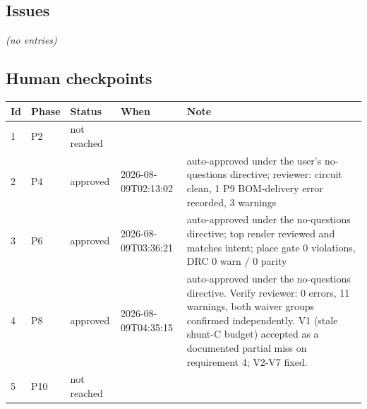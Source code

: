 \documentclass[11pt,a4paper]{article}
\begin{document}
\subsection*{Issues}
\emph{(no entries)}
\subsection*{Human checkpoints}
{\small
\begin{longtable}{lllp{2.6cm}p{6.4cm}}
\toprule
\textbf{Id} & \textbf{Phase} & \textbf{Status} & \textbf{When} & \textbf{Note} \\
\midrule
\endhead
1 & P2 & not reached &  &  \\
2 & P4 & approved & 2026-08-09T02:13:02 & auto-approved under the user's no-questions directive; reviewer: circuit clean, 1 P9 BOM-delivery error recorded, 3 warnings \\
3 & P6 & approved & 2026-08-09T03:36:21 & auto-approved under the no-questions directive; top render reviewed and matches intent; place gate 0 violations, DRC 0 warn / 0 parity \\
4 & P8 & approved & 2026-08-09T04:35:15 & auto-approved under the no-questions directive. Verify reviewer: 0 errors, 11 warnings, both waiver groups confirmed independently. V1 (stale shunt-C budget) accepted as a documented partial miss on requirement 4; V2-V7 fixed. \\
5 & P10 & not reached &  &  \\
\bottomrule
\end{longtable}
}
\end{document}
